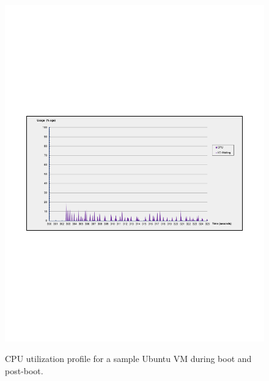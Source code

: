 \begin{figure}
           {\includegraphics[width=\textwidth, trim=2cm 8cm 2cm 8cm]{cpu-ss.pdf} \label{fig:b}} 
  \caption[CPU utilization profile for a sample Ubuntu VM during boot and post-boot.]%
          {CPU utilization profile for a sample Ubuntu VM during boot and post-boot.}
  \label{data:bootcpu}
\end{figure}

